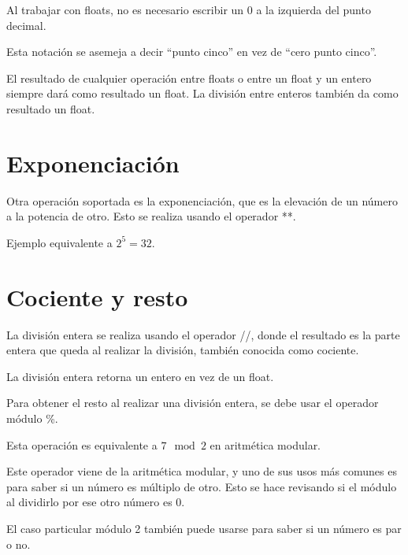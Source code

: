 \documentclass{report}
\newcommand{\doble}[1]{``#1''}
\begin{document}
Al trabajar con floats, no es necesario escribir un 0 a la izquierda del punto decimal.


Esta notación se asemeja a decir \doble{punto cinco} en vez de \doble{cero punto cinco}.

El resultado de cualquier operación entre floats o entre un float y un entero siempre dará como resultado un float. La división entre enteros también da como resultado un float.


\section{Exponenciación}

Otra operación soportada es la exponenciación, que es la elevación de un número a la potencia de otro. Esto se realiza usando el operador **.

Ejemplo equivalente a $2 ^ 5 = 32$.


\section{Cociente y resto}

La división entera se realiza usando el operador //, donde el resultado es la parte entera que queda al realizar la división, también conocida como cociente.

La división entera retorna un entero en vez de un float.


Para obtener el resto al realizar una división entera, se debe usar el operador módulo \%.


Esta operación es equivalente a $7 \mod{2}$ en aritmética modular.

Este operador viene de la aritmética modular, y uno de sus usos más comunes es para saber si un número es múltiplo de otro. Esto se hace revisando si el módulo al dividirlo por ese otro número es 0.


El caso particular módulo 2 también puede usarse para saber si un número es par o no.
\end{document}

